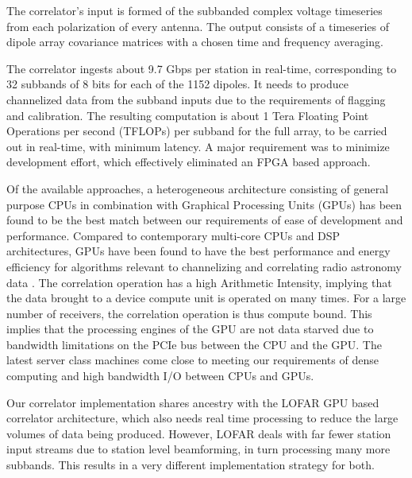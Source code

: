 \documentclass{ws-jai}
\begin{document}
The correlator's  input is  formed of the  subbanded complex  voltage timeseries
from each polarization of every antenna.  The output consists of a timeseries of
dipole array covariance matrices with a chosen time and frequency averaging.

The correlator ingests about 9.7 Gbps per station in real-time, corresponding to
32  subbands of  8 bits  for each  of  the 1152  dipoles.  It  needs to  produce
channelized data from the subband inputs due to the requirements of flagging and
calibration. The resulting computation is about 1 Tera Floating Point Operations
per  second (TFLOPs)  per subband  for  the full  array,  to be  carried out  in
real-time,  with  minimum   latency.   A  major  requirement   was  to  minimize
development effort, which effectively eliminated an FPGA based approach.

Of the available approaches, a  heterogeneous architecture consisting of general
purpose  CPUs in  combination with  Graphical Processing  Units (GPUs)  has been
found to be the  best match between our requirements of  ease of development and
performance.  Compared  to contemporary  multi-core CPUs and  DSP architectures,
GPUs have  been found  to have  the best performance  and energy  efficiency for
algorithms  relevant  to  channelizing  and  correlating  radio  astronomy  data
\cite{romein2016comparison}.  The  correlation operation  has a  high Arithmetic
Intensity, implying that  the data brought to a device  compute unit is operated
on many  times.  For a large  number of receivers, the  correlation operation is
thus compute bound. This implies that the  processing engines of the GPU are not
data starved due  to bandwidth limitations on  the PCIe bus between  the CPU and
the  GPU.   The  latest  server  class   machines  come  close  to  meeting  our
requirements of dense computing and high bandwidth I/O between CPUs and GPUs.

Our  correlator  implementation  shares  ancestry   with  the  LOFAR  GPU  based
correlator architecture,  which also  needs real time  processing to  reduce the
large  volumes of  data being  produced.  However,  LOFAR deals  with far  fewer
station input streams due to station  level beamforming, in turn processing many
more  subbands. This  results in  a very  different implementation  strategy for
both.


\end{document}
